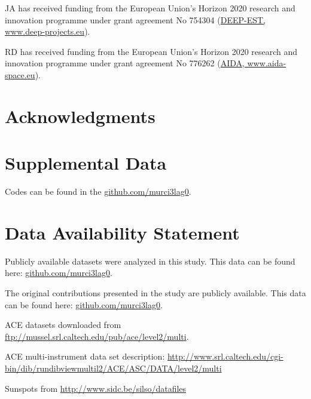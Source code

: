 \documentclass[utf8]{frontiersSCNS} %
\begin{document}
JA has received funding from the European Union’s Horizon 2020 research and innovation programme under grant agreement No 754304 (\href{https://www.deep-projects.eu}{DEEP-EST, www.deep-projects.eu}).

RD has received funding from the European Union’s Horizon 2020 research and innovation programme under grant agreement No 776262 (\href{https://www.aida-space.eu}{AIDA, www.aida-space.eu}).

\section*{Acknowledgments}

\section*{Supplemental Data}
Codes can be found in the \href{http://github.com/murci3lag0}{github.com/murci3lag0}.

\section*{Data Availability Statement}
\label{sec:repos}

Publicly available datasets were analyzed in this study. This data can be found here: \href{http://github.com/murci3lag0}{github.com/murci3lag0}.

The original contributions presented in the study are publicly available. This data can be found here: \href{http://github.com/murci3lag0}{github.com/murci3lag0}.

ACE datasets downloaded from \href{ftp://mussel.srl.caltech.edu/pub/ace/level2/multi}{ftp://mussel.srl.caltech.edu/pub/ace/level2/multi}.

ACE multi-instrument data set description: \href{http://www.srl.caltech.edu/cgi-bin/dib/rundibviewmultil2/ACE/ASC/DATA/level2/multi}{http://www.srl.caltech.edu/cgi-bin/dib/rundibviewmultil2/ACE/ASC/DATA/level2/multi}

Sunspots from \href{http://www.sidc.be/silso/datafiles}{http://www.sidc.be/silso/datafiles}



\end{document}
